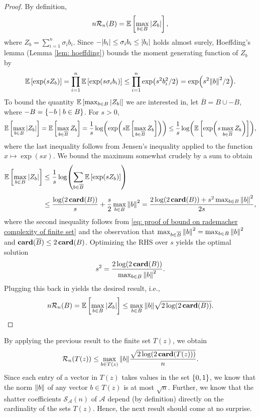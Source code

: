\begin{proof}
By definition,
\[
    n \mathcal{R}_n(B) = \mathbb{E}\left[ \max_{b \in B} \abs{Z_b} \right],
\]
where $Z_b = \sum_{i=1}^n \sigma_i b_i$. Since $-\abs{b_i} \leq \sigma_i b_i \leq \abs{b_i}$ holds almost surely, Hoeffding's lemma (Lemma \ref{lem: hoeffding}) bounds the moment generating function of $Z_b$ by
\begin{equation}
\label{eq: proof of bound on rademacher complexity of finite set}
    \mathbb{E}\left[\exp(s Z_b)\right] = \prod_{i=1}^n \mathbb{E}\left[\exp(s \sigma_i b_i)\right] \leq \prod_{i=1}^n \exp(s^2 b_i^2 / 2) = \exp(s^2 \norm{b}^2 / 2).
\end{equation}
To bound the quantity $\mathbb{E}\left[\max_{b \in B} \abs{Z_b}\right]$ we are interested in, let $\overline{B} = B \cup -B$, where $-B = \left\{-b \mathrel{|} b \in B\right\}$. For $s>0$,
\[
    \mathbb{E}\left[\max_{b \in B} \abs{Z_b}\right] = \mathbb{E}\left[\max_{b \in \overline{B}} Z_b\right] = \frac{1}{s} \log( \exp( s \mathbb{E}\left[\max_{b \in \overline{B}} Z_b\right] )) \leq \frac{1}{s} \log(\mathbb{E}\left[ \exp( s \max_{b \in \overline{B}} Z_b )\right] ),
\]
where the last inequality follows from Jensen's inequality applied to the function $x \mapsto \exp(sx)$. We bound the maximum somewhat crudely by a sum to obtain
\begin{align*}
    \mathbb{E}\left[\max_{b \in B} \abs{Z_b}\right] &\leq \frac{1}{s} \log( \sum_{b \in \overline{B}} \mathbb{E}\left[\exp(s Z_b)\right] ) \\[4pt]
        &\leq \frac{\log(2 \, \mathrm{\mathbf{card}}(B))}{s} + \frac{s}{2} \max_{b \in B} \norm{b}^2 = \frac{2 \log(2 \, \mathrm{\mathbf{card}}(B)) + s^2 \max_{b \in B} \norm{b}^2}{2s},
\end{align*}
where the second inequality follows from \eqref{eq: proof of bound on rademacher complexity of finite set} and the observation that $\max_{b \in \overline{B}} \norm{b}^2 = \max_{b \in B} \norm{b}^2$ and $\mathrm{\mathbf{card}}(\overline{B}) \leq 2 \, \mathrm{\mathbf{card}}(B)$. Optimizing the RHS over $s$ yields the optimal solution
\[
    s^2 = \frac{2 \log(2 \, \mathrm{\mathbf{card}}(B))}{\max_{b \in B} \norm{b}^2}.
\]
Plugging this back in yields the desired result, i.e.,
\[
    n \mathcal{R}_n(B) = \mathbb{E}\left[ \max_{b \in B} \abs{Z_b} \right] \leq \max_{b \in B} \norm{b} \sqrt{2 \log(2 \, \mathrm{\mathbf{card}}(B))}.
\]
\end{proof}

By applying the previous result to the finite set $T(z)$, we obtain
\[
    \mathcal{R}_n(T(z)) \leq \max_{b \in T(z)} \norm{b} \frac{\sqrt{2 \log(2 \, \mathrm{\mathbf{card}}(T(z)))}}{n}.
\]
Since each entry of a vector in $T(z)$ takes values in the set $\left\{0, 1\right\}$, we know that the norm $\norm{b}$ of any vector $b \in T(z)$ is at most $\sqrt{n}$. Further, we know that the shatter coefficients $\mathcal{S}_{\mathcal{A}}(n)$ of $\mathcal{A}$ depend (by definition) directly on the cardinality of the sets $T(z)$. Hence, the next result should come at no surprise.

